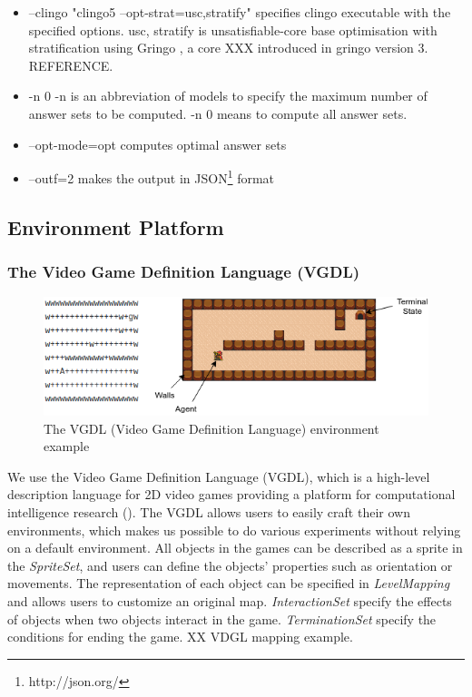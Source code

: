 \begin{itemize}
\item \textsf{--clingo "clingo5 --opt-strat=usc,stratify"} specifies clingo executable with the specified options. 
\textsf{usc, stratify} is unsatisfiable-core base optimisation with stratification using Gringo \cite{gringo}, a core XXX introduced in gringo version 3. REFERENCE.
\item \textsf{-n 0} -n is an abbreviation of \textsf{models} to specify the maximum number of answer sets to be computed. \textsf{-n 0} means to compute all answer sets.
\item \textsf{--opt-mode=opt} computes optimal answer sets
\item \textsf{--outf=2} makes the output in JSON\footnote{http://json.org/} format
\end{itemize}

\subsection{Environment Platform}
\subsubsection{The Video Game Definition Language (VGDL)}

\begin{figure}[!ht!b]
\centering
\includegraphics[width=1\textwidth]{./figures/env_sample}
\caption{The VGDL (Video Game Definition Language) environment example} 
\label{VGDL_sample}
\end{figure}

We use the Video Game Definition Language (VGDL), which is a high-level description language for 2D video games providing a platform for computational intelligence research (\cite{Schaul2013}).
The VGDL allows users to easily craft their own environments, which makes us possible to do various experiments without relying on a default environment. 
All objects in the games can be described as a sprite in the \textit{SpriteSet}, and users can define the objects' properties such as orientation or movements.
The representation of each object can be specified in \textit{LevelMapping} and allows users to customize an original map.
\textit{InteractionSet} specify the effects of objects when two objects interact in the game.
\textit{TerminationSet} specify the conditions for ending the game.
XX VDGL mapping example.

